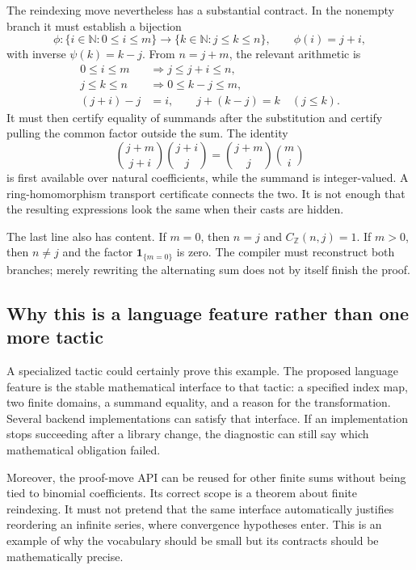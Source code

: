 \documentclass[11pt,a4paper]{article}
\newcommand{\N}{\mathbb N}
\newcommand{\Z}{\mathbb Z}
\newcommand{\ind}[1]{\mathbf 1_{\{#1\}}}
\theoremstyle{remark}
\begin{document}
The reindexing move nevertheless has a substantial contract. In the nonempty branch it must establish a bijection
\[
\phi:\{i\in\N:0\leq i\leq m\}\longrightarrow
\{k\in\N:j\leq k\leq n\},\qquad \phi(i)=j+i,
\]
with inverse $\psi(k)=k-j$. From $n=j+m$, the relevant arithmetic is
\begin{align*}
0\leq i\leq m&\Longrightarrow j\leq j+i\leq n,\\
j\leq k\leq n&\Longrightarrow 0\leq k-j\leq m,\\
(j+i)-j&=i,\qquad j+(k-j)=k\quad(j\leq k).
\end{align*}
It must then certify equality of summands after the substitution and certify pulling the common factor outside the sum. The identity
\[
\binom{j+m}{j+i}\binom{j+i}{j}
=\binom{j+m}{j}\binom mi
\]
is first available over natural coefficients, while the summand is integer-valued. A ring-homomorphism transport certificate connects the two. It is not enough that the resulting expressions look the same when their casts are hidden.

The last line also has content. If $m=0$, then $n=j$ and $C_{\Z}(n,j)=1$. If $m>0$, then $n\ne j$ and the factor $\ind{m=0}$ is zero. The compiler must reconstruct both branches; merely rewriting the alternating sum does not by itself finish the proof.

\subsection{Why this is a language feature rather than one more tactic}
A specialized tactic could certainly prove this example. The proposed language feature is the stable mathematical interface to that tactic: a specified index map, two finite domains, a summand equality, and a reason for the transformation. Several backend implementations can satisfy that interface. If an implementation stops succeeding after a library change, the diagnostic can still say which mathematical obligation failed.

Moreover, the proof-move API can be reused for other finite sums without being tied to binomial coefficients. Its correct scope is a theorem about finite reindexing. It must not pretend that the same interface automatically justifies reordering an infinite series, where convergence hypotheses enter. This is an example of why the vocabulary should be small but its contracts should be mathematically precise.
\end{document}
